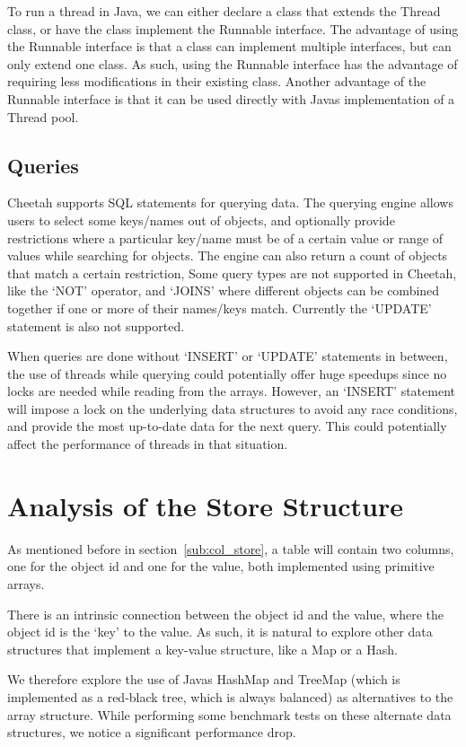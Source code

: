 \documentclass[11pt,journal,compsoc]{IEEEtran}
\begin{document}
To run a thread in Java, we can either declare a class that extends the Thread class, or have the class implement the Runnable interface. The advantage of using the Runnable interface is that a class can implement multiple interfaces, but can only extend one class. As such, using the Runnable interface has the advantage of requiring less modifications in their existing class. Another advantage of the Runnable interface is that it can be used directly with Java\textquotesingle s implementation of a Thread pool. 

\subsection{Queries}

Cheetah supports SQL statements for querying data. The querying engine allows users to select some keys/names out of objects, and optionally provide  restrictions where a particular key/name must be of a certain value or range of values while searching for objects. The engine can also return a count of objects that match a certain restriction, Some query types are not supported in Cheetah, like the ‘NOT’ operator, and ‘JOINS’ where different objects can be combined together if one or more of their names/keys match. Currently the ‘UPDATE’ statement is also not supported.


When queries are done without ‘INSERT’ or ‘UPDATE’ statements in between, the use of threads while querying could potentially offer huge speedups since no locks are needed while reading from the arrays. However, an ‘INSERT’ statement will impose a lock on the underlying data structures to avoid any race conditions, and provide the most up-to-date data for the next query. This could potentially affect the performance of threads in that situation.


\section{Analysis of the Store Structure}
As mentioned before in section~\ref{sub:col_store}, a table will contain two columns, one for the object id and one for the value, both implemented using primitive arrays.

There is an intrinsic connection between the object id and the value, where the object id is the ‘key’ to the value. As such, it is natural to explore other data structures that implement a key-value structure, like a Map or a Hash.

We therefore explore the use of Java\textquotesingle s HashMap and TreeMap (which is implemented as a red-black tree, which is always balanced) as alternatives to the array structure. While performing some benchmark tests on these alternate data structures, we notice a significant performance drop.
\end{document}
